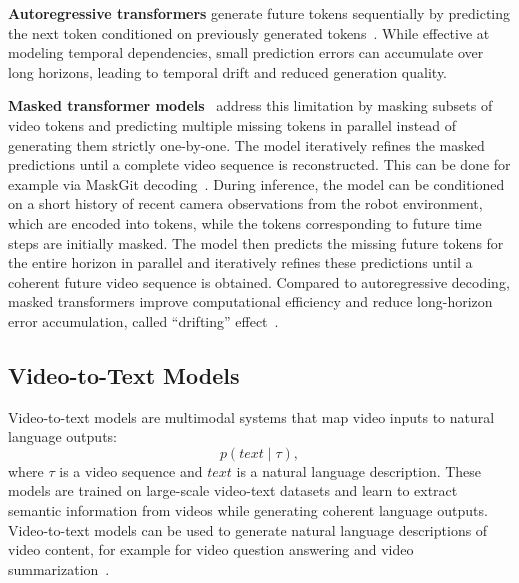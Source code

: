 \textbf{Autoregressive transformers} generate future tokens sequentially by predicting the next token conditioned on previously generated tokens~\cite{Yan2021VideoGPTVG, Hu2023GAIA1AG, Bruce2024GenieGI}. While effective at modeling temporal dependencies, small prediction errors can accumulate over long horizons, leading to temporal drift and reduced generation quality. 

\textbf{Masked transformer models}~\cite{Yu2022MAGVITMG, Yu2023LanguageTR, Gupta2022MaskViTMV} address this limitation by masking subsets of video tokens and predicting multiple missing tokens in parallel instead of generating them strictly one-by-one. The model iteratively refines the masked predictions until a complete video sequence is reconstructed. This can be done for example via MaskGit decoding~\cite{Chang2022MaskGITMG}.
During inference, the model can be conditioned on a short history of recent camera observations from the robot environment, which are encoded into tokens, while the tokens corresponding to future time steps are initially masked. The model then predicts the missing future tokens for the entire horizon in parallel and iteratively refines these predictions until a coherent future video sequence is obtained.
Compared to autoregressive decoding, masked transformers improve computational efficiency and reduce long-horizon error accumulation, called ``drifting'' effect~\cite{Yang2024VideoAT}.





\subsection{Video-to-Text Models}
\label{sec:VideoToTextModels}
Video-to-text models are multimodal systems that map video inputs to natural language outputs:
\begin{equation}
p(text \mid \tau),
\end{equation}
where $\tau$ is a video sequence and $text$ is a natural language description. These models are trained on large-scale video-text datasets and learn to extract semantic information from videos while generating coherent language outputs.
Video-to-text models can be used to generate natural language descriptions of video content, for example for video question answering and video summarization~\cite{McCarthy_2025}.




